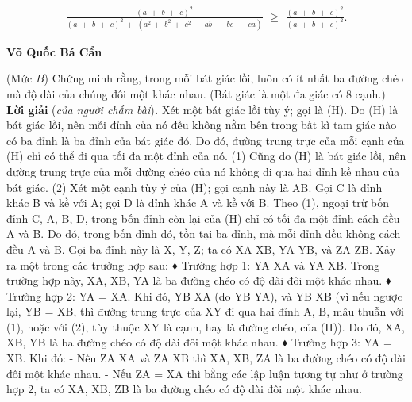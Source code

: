 \begin{multicols}{2}
	\begin{align*}
		\frac{{{{\left( {a\,\, + \,\,b\,\, + \,\,c} \right)}^2}}}{{{{\left( {a\,\, + \,\,b\,\, + \,\,c} \right)}^2}\, + \,\,\left( {{a^2}\, + \,\,{b^2}\, + \,\,{c^2}\, - \,\,ab\,\, - \,\,bc\,\, - \,\,ca} \right)}}\,\, \ge \,\,\frac{{{{\left( {a\,\, + \,\,b\,\, + \,\,c} \right)}^2}}}{{{{\left( {a\,\, + \,\,b\,\, + \,\,c} \right)}^2}}}.
	\end{align*}
	\begin{flushright}
		\textbf{Võ Quốc Bá Cẩn}
	\end{flushright}
	{}
	(Mức $B$)
	Chứng minh rằng, trong mỗi bát giác lồi, luôn có ít nhất ba đường chéo mà độ dài của chúng đôi một khác nhau.
	(Bát giác là một đa giác có $8$ cạnh.)
	\vskip 0.05cm
	\textbf{Lời giải} (\textit{của người chấm bài})\textbf{.}
	\vskip 0.05cm
	Xét một bát giác lồi tùy ý; gọi là (H).
	Do (H) là bát giác lồi, nên mỗi đỉnh của nó đều không nằm bên trong bất kì tam giác nào có ba đỉnh là ba đỉnh của bát giác đó. Do đó, đường trung trực của mỗi cạnh của (H) chỉ có thể đi qua tối đa một đỉnh của nó.                                                                                                                                             (1)
	Cũng do (H) là bát giác lồi, nên đường trung trực của mỗi đường chéo của nó không đi qua hai đỉnh kề nhau của bát giác.                                                                                                                                   (2)
	Xét một cạnh tùy ý của (H); gọi cạnh này là AB. Gọi C là đỉnh khác B và kề với A; gọi D là đỉnh khác A và kề với B.
	Theo (1), ngoại trừ bốn đỉnh C, A, B, D, trong bốn đỉnh còn lại của (H) chỉ có tối đa một đỉnh cách đều A và B. Do đó, trong bốn đỉnh đó, tồn tại ba đỉnh, mà mỗi đỉnh đều không cách đều A và B. Gọi ba đỉnh này là X, Y, Z; ta có XA \ne XB, YA \ne YB, và ZA \ne ZB. Xảy ra một trong các trường hợp sau:
	♦ Trường hợp 1: YA \ne XA và YA \ne XB.
	Trong trường hợp này, XA, XB, YA là ba đường chéo có độ dài đôi một khác nhau.
	♦ Trường hợp 2: YA = XA.
	Khi đó, YB \ne XA (do YB \ne YA), và YB \ne XB (vì nếu ngược lại, YB = XB, thì đường trung trực của XY đi qua hai đỉnh A, B, mâu thuẫn với (1), hoặc với (2), tùy thuộc XY là cạnh, hay là đường chéo, của (H)). Do đó, XA, XB, YB là ba đường chéo có độ dài đôi một khác nhau.
	♦ Trường hợp 3: YA = XB.
	Khi đó:
	- Nếu ZA \ne XA và ZA \ne XB thì XA, XB, ZA là ba đường chéo có độ dài đôi một khác nhau.
	- Nếu ZA = XA thì bằng các lập luận tương tự như ở trường hợp 2, ta có XA, XB, ZB là ba đường chéo có độ dài đôi một khác nhau.

\end{multicols}

